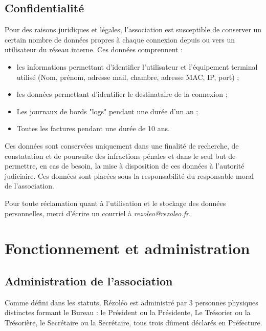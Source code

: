 \documentclass[12pt, a4paper]{article}
\begin{document}
	\subsection{Confidentialité}

	Pour des raisons juridiques et légales, l'association est susceptible de
	conserver un certain nombre de données propres à chaque connexion depuis ou
	vers un utilisateur du réseau interne. Ces données comprennent :

	\bigskip

	\begin{itemize}
		\item[\textbullet] les informations permettant d'identifier l'utilisateur et
			l'équipement terminal utilisé (Nom, prénom, adresse mail, chambre, adresse
			MAC, IP, port) ;

		\item[\textbullet] les données permettant d'identifier le destinataire de la
			connexion ;

		\item[\textbullet] Les journaux de bords "logs" pendant une durée d'un an ; 

		\item[\textbullet] Toutes les factures pendant une durée de 10 ans.
	\end{itemize}

	\bigskip

	Ces données sont conservées uniquement dans une finalité de recherche, de
	constatation et de poursuite des infractions pénales et dans le seul but de
	permettre, en cas de besoin, la mise à disposition de ces données à l'autorité
	judiciaire. Ces données sont placées sous la responsabilité du responsable moral
	de l'association.

	\bigskip

	Pour toute réclamation quant à l'utilisation et le stockage des données
	personnelles, merci d'écrire un courriel à \textit{rezoleo@rezoleo.fr}.

	\section{Fonctionnement et administration}

	\subsection{Administration de l'association}

	Comme défini dans les statuts, Rézoléo est administré par 3 personnes
	physiques distinctes formant le Bureau : le Président ou la Présidente, Le Trésorier
	ou la Trésorière, le Secrétaire ou la Secrétaire, tous trois dûment déclarés en
	Préfecture.
\end{document}

